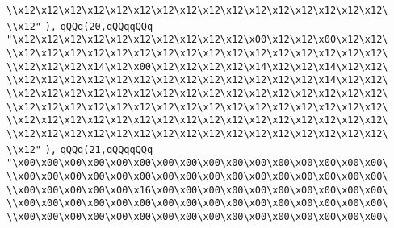 \verb|\\x12\x12\x12\x12\x12\x12\x12\x12\x12\x12\x12\x12\x12\x12\x12\x12\|\newline
\verb|\\x12"|\newline
\verb|),|\newline
\verb|qQQq(20,qQQqqQQq|\newline
\verb|"\x12\x12\x12\x12\x12\x12\x12\x12\x12\x12\x00\x12\x12\x00\x12\x12\|\newline
\verb|\\x12\x12\x12\x12\x12\x12\x12\x12\x12\x12\x12\x12\x12\x12\x12\x12\|\newline
\verb|\\x12\x12\x12\x14\x12\x00\x12\x12\x12\x12\x14\x12\x12\x14\x12\x12\|\newline
\verb|\\x12\x12\x12\x12\x12\x12\x12\x12\x12\x12\x12\x12\x12\x14\x12\x12\|\newline
\verb|\\x12\x12\x12\x12\x12\x12\x12\x12\x12\x12\x12\x12\x12\x12\x12\x12\|\newline
\verb|\\x12\x12\x12\x12\x12\x12\x12\x12\x12\x12\x12\x12\x12\x12\x12\x12\|\newline
\verb|\\x12\x12\x12\x12\x12\x12\x12\x12\x12\x12\x12\x12\x12\x12\x12\x12\|\newline
\verb|\\x12\x12\x12\x12\x12\x12\x12\x12\x12\x12\x12\x12\x12\x12\x12\x12\|\newline
\verb|\\x12"|\newline
\verb|),|\newline
\verb|qQQq(21,qQQqqQQq|\newline
\verb|"\x00\x00\x00\x00\x00\x00\x00\x00\x00\x00\x00\x00\x00\x00\x00\x00\|\newline
\verb|\\x00\x00\x00\x00\x00\x00\x00\x00\x00\x00\x00\x00\x00\x00\x00\x00\|\newline
\verb|\\x00\x00\x00\x00\x00\x16\x00\x00\x00\x00\x00\x00\x00\x00\x00\x00\|\newline
\verb|\\x00\x00\x00\x00\x00\x00\x00\x00\x00\x00\x00\x00\x00\x00\x00\x00\|\newline
\verb|\\x00\x00\x00\x00\x00\x00\x00\x00\x00\x00\x00\x00\x00\x00\x00\x00\|\newline
